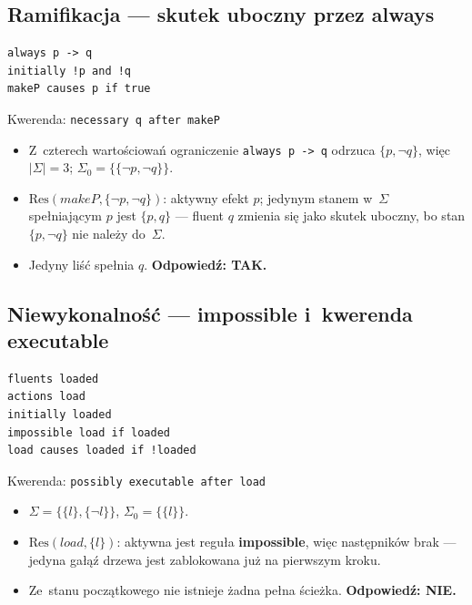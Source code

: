 \documentclass[11pt,a4paper]{article}
\newcommand{\Res}{\mathrm{Res}}
\begin{document}
\subsection{Ramifikacja --- skutek uboczny przez \textbf{always}}

\begin{verbatim}
always p -> q
initially !p and !q
makeP causes p if true
\end{verbatim}
Kwerenda: \texttt{necessary q after makeP}

\begin{itemize}
  \item Z~czterech wartościowań ograniczenie \texttt{always p -> q} odrzuca
        $\{p,\lnot q\}$, więc $|\Sigma| = 3$;
        $\Sigma_0 = \{\{\lnot p,\lnot q\}\}$.
  \item $\Res(\mathit{makeP}, \{\lnot p,\lnot q\})$: aktywny efekt $p$; jedynym
        stanem w~$\Sigma$ spełniającym $p$ jest $\{p,q\}$ --- fluent $q$
        zmienia się jako skutek uboczny, bo stan $\{p,\lnot q\}$ nie należy
        do~$\Sigma$.
  \item Jedyny liść spełnia $q$. \textbf{Odpowiedź: TAK.}
\end{itemize}

\subsection{Niewykonalność --- \textbf{impossible} i~kwerenda \textbf{executable}}

\begin{verbatim}
fluents loaded
actions load
initially loaded
impossible load if loaded
load causes loaded if !loaded
\end{verbatim}
Kwerenda: \texttt{possibly executable after load}

\begin{itemize}
  \item $\Sigma = \{\{l\},\{\lnot l\}\}$, $\Sigma_0 = \{\{l\}\}$.
  \item $\Res(\mathit{load}, \{l\})$: aktywna jest reguła
        \textbf{impossible}, więc następników brak --- jedyna gałąź drzewa
        jest zablokowana już na pierwszym kroku.
  \item Ze~stanu początkowego nie istnieje żadna pełna ścieżka.
        \textbf{Odpowiedź: NIE.}
\end{itemize}
\end{document}
